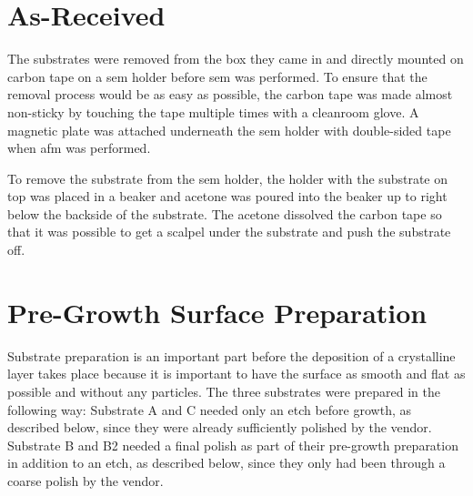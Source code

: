 %

\section{As-Received}
The substrates were removed from the box they came in and directly mounted on carbon tape on a \ac{sem} holder before \ac{sem} was performed. To ensure that the removal process would be as easy as possible, the carbon tape was made almost non-sticky by touching the tape multiple times with a cleanroom glove. A magnetic plate was attached underneath the \ac{sem} holder with double-sided tape when \ac{afm} was performed. 

To remove the substrate from the \ac{sem} holder, the holder with the substrate on top was placed in a beaker and acetone was poured into the beaker up to right below the backside of the substrate. The acetone dissolved the carbon tape so that it was possible to get a scalpel under the substrate and push the substrate off. %

\section{Pre-Growth Surface Preparation}
Substrate preparation is an important part before the deposition of a crystalline layer takes place because it is important to have the surface as smooth and flat as possible and without any particles. The three substrates were prepared in the following way: Substrate A and C needed only an etch before growth, as described below, since they were already sufficiently polished by the vendor. Substrate B and B2 needed a final polish as part of their pre-growth preparation in addition to an etch, as described below, since they only had been through a coarse polish by the vendor.

